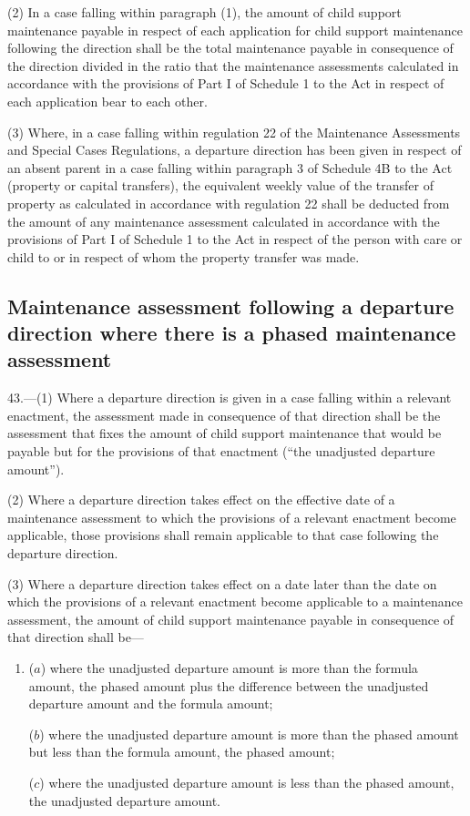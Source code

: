 \documentclass[a4paper]{article}
\begin{document}
(2) In a case falling within paragraph (1), the amount of child support maintenance payable in respect of each application for child support maintenance following the direction shall be the total maintenance payable in consequence of the direction divided in the ratio that the maintenance assessments calculated in accordance with the provisions of Part I of Schedule 1 to the Act in respect of each application bear to each other.

(3) Where, in a case falling within regulation 22 of the Maintenance Assessments and Special Cases Regulations, a departure direction has been given in respect of an absent parent in a case falling within paragraph 3 of Schedule 4B to the Act (property or capital transfers), the equivalent weekly value of the transfer of property as calculated in accordance with regulation 22 shall be deducted from the amount of any maintenance assessment calculated in accordance with the provisions of Part I of Schedule 1 to the Act in respect of the person with care or child to or in respect of whom the property transfer was made.

\subsection[43. Maintenance assessment following a departure direction where there is a phased maintenance assessment]{Maintenance assessment following a departure direction where there is a phased maintenance assessment}

43.—(1) Where a departure direction is given in a case falling within a relevant enactment, the assessment made in consequence of that direction shall be the assessment that fixes the amount of child support maintenance that would be payable but for the provisions of that enactment (“the unadjusted departure amount”).

(2) Where a departure direction takes effect on the effective date of a maintenance assessment to which the provisions of a relevant enactment become applicable, those provisions shall remain applicable to that case following the departure direction.

(3) Where a departure direction takes effect on a date later than the date on which the provisions of a relevant enactment become applicable to a maintenance assessment, the amount of child support maintenance payable in consequence of that direction shall be—
\begin{enumerate}\item[]
($a$) where the unadjusted departure amount is more than the formula amount, the phased amount plus the difference between the unadjusted departure amount and the formula amount;

($b$) where the unadjusted departure amount is more than the phased amount but less than the formula amount, the phased amount;

($c$) where the unadjusted departure amount is less than the phased amount, the unadjusted departure amount.
\end{enumerate}
\end{document}
